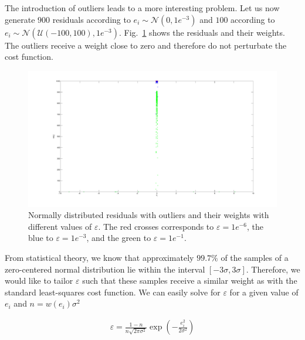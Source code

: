 \documentclass[12pt]{article}
\begin{document}
        The introduction of outliers leads to a more interesting problem. Let
        us now generate $900$ residuals according to
        $e_i\sim\mathcal{N}(0,1e^{-3})$ and $100$ according to
        $e_i\sim\mathcal{N}(\mathcal{U}(-100,100),1e^{-3})$. Fig.~\ref{fig:bz2}
        shows the residuals and their weights. The outliers receive a weight
        close to zero and therefore do not perturbate the cost function.

        \begin{figure}[t]
          \centering
          \includegraphics[scale=0.3]{bz2.pdf}
          \caption{Normally distributed residuals with outliers and their
            weights with
            different values of
            $\varepsilon$. The red crosses corresponds to $\varepsilon=1e^{-6}$,
            the blue to $\varepsilon=1e^{-3}$, and the green to
            $\varepsilon=1e^{-1}$.}
          \label{fig:bz2}
        \end{figure}

        From statistical theory, we know that approximately $99.7\%$ of the
        samples of a zero-centered normal distribution lie within the interval
        $[-3\sigma,3\sigma]$. Therefore, we would like to tailor $\varepsilon$
        such that these samples receive a similar weight as with the standard
        least-squares cost function. We can easily solve for $\varepsilon$ for
        a given value of $e_i$ and $n=w(e_i)\sigma^2$

        \begin{equation}\label{eqn:model1dwbz2}
          \begin{aligned}
            \varepsilon = \frac{1-n}{n\sqrt{2\pi\sigma^2}}
              \exp(-\frac{e_i^2}{2\sigma^2})
          \end{aligned}
        \end{equation}
\end{document}
